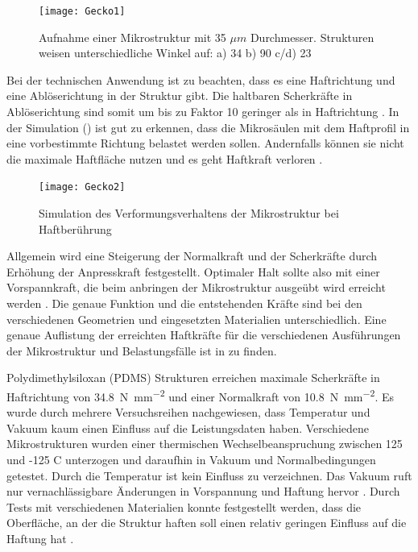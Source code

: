 	\begin{figure}[H]
	\centering
		\texttt{[image: Gecko1]}
	\caption{Aufnahme einer Mikrostruktur mit 35 $\mu m$ Durchmesser. Strukturen weisen unterschiedliche Winkel auf: a) 	34\textdegree{}  b) 90\textdegree{}  c/d) 23\textdegree{} \cite{Schwerter.}}
	\label{fig:Gecko1}
\end{figure}


Bei der technischen Anwendung ist zu beachten, dass es eine Haftrichtung und eine Ablöserichtung in der Struktur gibt. Die haltbaren Scherkräfte in Ablöserichtung sind somit um bis zu Faktor \num{10} geringer als in Haftrichtung \cite{Schwerter.}.
In der Simulation () ist gut zu erkennen, dass die Mikrosäulen mit dem Haftprofil in eine vorbestimmte Richtung belastet werden sollen. Andernfalls können sie nicht die maximale Haftfläche nutzen und es geht Haftkraft verloren \cite{Schwerter.}. 


\begin{figure}[H]
	\centering
		\texttt{[image: Gecko2]}
	\caption{Simulation des Verformungsverhaltens der Mikrostruktur bei Haftberührung \cite[Abbildung 19, Seite43]{Schwerter.}}
	\label{fig:Gecko2}
\end{figure}	


Allgemein wird eine Steigerung der Normalkraft und der Scherkräfte durch Erhöhung der Anpresskraft festgestellt. Optimaler Halt sollte also mit einer Vorspannkraft, die beim anbringen der Mikrostruktur ausgeübt wird erreicht werden \cite{Schwerter.}. Die genaue Funktion und die entstehenden Kräfte sind bei den verschiedenen Geometrien und eingesetzten Materialien unterschiedlich. Eine genaue Auflistung der erreichten Haftkräfte für die verschiedenen Ausführungen der Mikrostruktur und Belastungsfälle ist in \cite[Tabelle 1]{Schwerter.} zu finden.

Polydimethylsiloxan (PDMS) Strukturen erreichen maximale Scherkräfte in Haftrichtung von \SI{34,8}{\newton\per\square\milli\metre} und einer Normalkraft von \SI{10,8}{\newton\per\square\milli\metre}.
Es wurde durch mehrere Versuchsreihen nachgewiesen, dass Temperatur und Vakuum kaum einen Einfluss auf die Leistungsdaten haben. Verschiedene Mikrostrukturen wurden einer thermischen Wechselbeanspruchung zwischen 125 und -125 \textdegree{} C unterzogen und daraufhin in Vakuum und Normalbedingungen getestet. Durch die Temperatur ist kein Einfluss zu verzeichnen. Das Vakuum ruft nur vernachlässigbare Änderungen in Vorspannung und Haftung hervor \cite[Bild 11]{Trentlage.}. Durch Tests mit verschiedenen Materialien konnte festgestellt werden, dass die Oberfläche, an der die Struktur haften soll einen relativ geringen Einfluss auf die Haftung hat \cite[Bild 16]{Trentlage.}.


